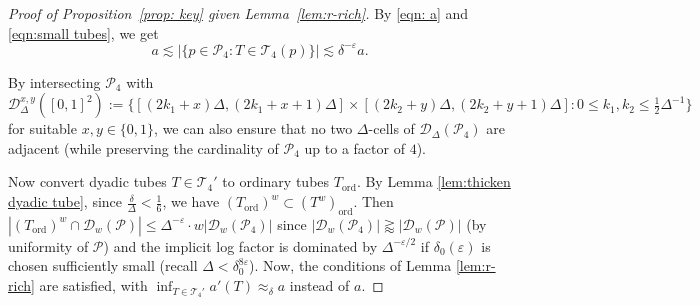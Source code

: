 \documentclass{amsart}
\newcommand{\T}{\mathcal{T}}
\newcommand{\eps}{\varepsilon}
\newcommand{\geapp}{\gtrapprox}
\newcommand{\app}{\approx}
\newcommand{\cD}{\mathcal{D}}
\newcommand{\cT}{\mathcal{T}}
\newcommand{\cP}{\mathcal{P}}
\newcommand{\ord}{\mathrm{ord}}
\begin{document}
\begin{proof}[Proof of Proposition~\ref{prop: key} given Lemma~\ref{lem:r-rich}]
   By \eqref{eqn: a} and \eqref{eqn:small tubes}, we get
   \begin{equation}\label{eq: r}
  a\lesssim  |\{p\in \cP_4: T\in \cT_4(p)\}|\lesssim \delta^{-\eps} a. 
    \end{equation}

   By intersecting $\cP_4$ with $\cD_\Delta^{x,y} ([0,1]^2) := \{ [(2k_1 + x) \Delta, (2k_1 + x+1) \Delta ] \times [(2k_2 + y) \Delta, (2k_2 + y+1) \Delta ] : 0 \le k_1, k_2 \le \frac{1}{2} \Delta^{-1} \}$ for suitable $x, y \in \{ 0, 1 \}$, we can also ensure that no two $\Delta$-cells of $\cD_\Delta (\cP_4)$ are adjacent (while preserving the cardinality of $\cP_4$ up to a factor of $4$).

    Now convert dyadic tubes $T \in \cT_4'$ to ordinary tubes $T_\ord$. By Lemma \ref{lem:thicken dyadic tube}, since $\frac{\delta}{\Delta} < \frac{1}{6}$, we have $(T_\ord)^w \subset (T^w)_\ord$. Then $|(T_\ord)^w \cap \cD_w (\cP)| \le \Delta^{-\eps} \cdot w |\cD_w (\cP_4)|$ since $|\cD_w (\cP_4)| \geapp |\cD_w (\cP)|$ (by uniformity of $\cP$) and the implicit log factor is dominated by $\Delta^{-\eps/2}$ if $\delta_0 (\eps)$ is chosen sufficiently small (recall $\Delta < \delta_0^{8\eps}$). Now, the conditions of Lemma \ref{lem:r-rich} are satisfied, with $\inf_{T \in \T_4'} a'(T) \app_\delta a$ instead of $a$.


\end{proof}
\end{document}
